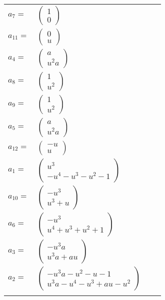 \documentclass[1p]{elsarticle_modified}
\theoremstyle{definition}
\begin{document}
\begin{tabular}{m{7pt} m{180pt} m{7pt} m{180pt} }
\flushright $a_{7}=$&$\begin{pmatrix}1\\0\end{pmatrix}$ \\
\flushright $a_{11}=$&$\begin{pmatrix}0\\u\end{pmatrix}$ \\
\flushright $a_{4}=$&$\begin{pmatrix}a\\u^2 a\end{pmatrix}$ \\
\flushright $a_{8}=$&$\begin{pmatrix}1\\u^2\end{pmatrix}$ \\
\flushright $a_{9}=$&$\begin{pmatrix}1\\u^2\end{pmatrix}$ \\
\flushright $a_{5}=$&$\begin{pmatrix}a\\u^2 a\end{pmatrix}$ \\
\flushright $a_{12}=$&$\begin{pmatrix}- u\\u\end{pmatrix}$ \\
\flushright $a_{1}=$&$\begin{pmatrix}u^3\\- u^4- u^3- u^2-1\end{pmatrix}$ \\
\flushright $a_{10}=$&$\begin{pmatrix}- u^3\\u^3+u\end{pmatrix}$ \\
\flushright $a_{6}=$&$\begin{pmatrix}- u^3\\u^4+u^3+u^2+1\end{pmatrix}$ \\
\flushright $a_{3}=$&$\begin{pmatrix}- u^3 a\\u^3 a+a u\end{pmatrix}$ \\
\flushright $a_{2}=$&$\begin{pmatrix}- u^3 a- u^2- u-1\\u^3 a- u^4- u^3+a u- u^2\end{pmatrix}$\\&\end{tabular}
\end{document}
